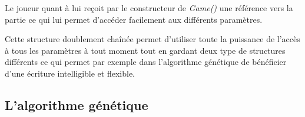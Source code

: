 \documentclass[10pt, french]{article}
\begin{document}
\par Le joueur quant à lui reçoit par le constructeur de \emph{Game()} une référence vers la partie ce qui lui permet d'accéder facilement aux différents paramètres.
\par Cette structure doublement chaînée permet d'utiliser toute la puissance de l'accès à tous les paramètres à tout moment tout en gardant deux type de structures différents ce qui permet par exemple dans l'algorithme génétique de bénéficier d'une écriture intelligible et flexible.
\paragraph{}



\paragraph{}
\subsection{L'algorithme génétique}
\end{document}
